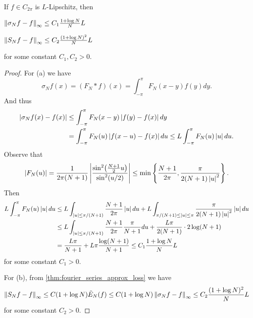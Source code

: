 \begin{theorem}
    If $f\in C_{2\pi}$ is $L$-Lipschitz, then
    \begin{thmenum}
        \item $\left\lVert {\sigma_Nf - f} \right\rVert_\infty \leq C_1\frac{1+\log N}{N}L$
        \item $\left\lVert {S_Nf - f} \right\rVert_\infty \leq C_2\frac{(1+\log N)^2}{N}L$
    \end{thmenum}
    for some constant $C_1,C_2>0$.
\end{theorem}
\begin{proof}
    For (a) we have 
    \begin{equation*}
        \sigma_Nf(x) = (F_N*f)(x) = \int_{-\pi}^\pi F_N(x-y)f(y)dy.
    \end{equation*}
    And thus
    \begin{equation*}
        \begin{split}
            \left\lvert {\sigma_Nf(x) - f(x)} \right\rvert &\leq \int_{-\pi}^\pi F_N(x-y)\left\lvert {f(y)-f(x)} \right\rvert dy \\
            &= \int_{-\pi}^\pi F_N(u)\left\lvert {f(x-u)-f(x)} \right\rvert du \leq L\int_{-\pi}^\pi F_N(u)\left\lvert {u} \right\rvert du.
        \end{split}
    \end{equation*}
    Observe that 
    \begin{equation*}
        \abs{F_N(u)} = \frac{1}{2\pi(N+1)}\abs{\frac{\sin^2\pth{\frac{N+1}{2}u}}{\sin^2(u/2)}} 
        \leq \min\set{\frac{N+1}{2\pi}, \frac{\pi}{2(N+1)\abs{u}^2}}.
    \end{equation*}
    Then 
    \begin{equation*}
        \begin{split}
            L\int_{-\pi}^\pi F_N(u)\left\lvert {u} \right\rvert du &\leq L\int_{\left\lvert {u} \right\rvert\leq \pi/(N+1)} \frac{N+1}{2\pi}\left\lvert {u} \right\rvert du + L\int_{\pi/(N+1)\leq\left\lvert {u} \right\rvert\leq\pi} \frac{\pi}{2(N+1)\left\lvert {u} \right\rvert^2}\left\lvert {u} \right\rvert du \\
            &\leq L\int_{\left\lvert {u} \right\rvert\leq \pi/(N+1)} \frac{N+1}{2\pi}\frac{\pi}{N+1}du + \frac{L\pi}{2(N+1)}\cdot 2\log(N+1) \\
            &= \frac{L\pi}{N+1} + L\pi\frac{\log(N+1)}{N+1} \leq C_1\frac{1+\log N}{N}L
        \end{split}
    \end{equation*}
    for some constant $C_1>0$. 
    
    For (b), from \cref{thm:fourier_series_approx_loss} we have
    \begin{equation*}
        \left\lVert {S_Nf - f} \right\rVert_\infty \leq C(1+\log N)\tilde{E}_N(f) 
        \leq C(1+\log N)\left\lVert {\sigma_Nf - f} \right\rVert_\infty \leq C_2\frac{(1+\log N)^2}{N}L
    \end{equation*}
    for some constant $C_2>0$.
\end{proof}
